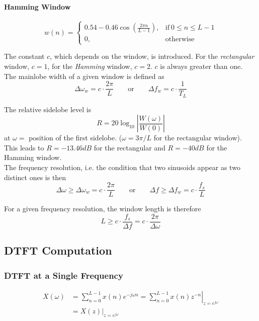 \paragraph{Hamming Window}
	\begin{equation*}
		w(n) = \begin{cases}
			0.54-0.46 \cos\left(\frac{2 \pi n}{L-1}\right), & \text{if} \: 0 \leq n \leq L-1 \\
			0, & \text{otherwise}
		\end{cases}
	\end{equation*}

The constant $c$, which depends on the window, is introduced. For the
\emph{rectangular} window, $c=1$, for the \emph{Hamming} window, $c=2$.
$c$ is always greater than one. \\

The mainlobe width of a given window is defined as
\begin{equation*}
	\Delta\omega_w = c \cdot \frac{2 \pi}{L} \qquad \text{or} \qquad \Delta f_w = c \cdot \frac{1}{T_L}
\end{equation*}

The relative sidelobe level is
\begin{equation*}
	R = 20 \log_{10} \left| \frac{W(\omega)}{W(0)} \right|
\end{equation*}
at $\omega = $ position of the first sidelobe. ($\omega=3\pi/L$ for the
rectangular window). This leads to $R = -13.46 dB$ for the rectangular
and $R = -40 dB$ for the Hamming window. \\

The frequency resolution, i.e. the condition that two sinusoids appear as
two distinct ones is then
\begin{equation*}
	 \Delta\omega \geq \Delta\omega_w = c \cdot \frac{2 \pi}{L}\qquad \text{or} \qquad \Delta f \geq \Delta f_w = c \cdot \frac{f_s}{L}
\end{equation*}

For a given frequency resolution, the window length is therefore
\begin{equation*}
	L \geq c \cdot \frac{f_s}{\Delta f} = c \cdot \frac{2 \pi}{\Delta \omega}
\end{equation*}

\subsection{DTFT Computation}

\subsubsection{DTFT at a Single Frequency}
\begin{align*}
X(\omega) & = \sum_{n=0}^{L-1}x(n)e^{-j\omega n}
 	  = \left.\sum_{n=0}^{L-1}x(n)z^{-n}\right|_{z=e^{j\omega}} \\
	& = \left. X(z)\right|_{z=e^{j\omega}}
\end{align*}

